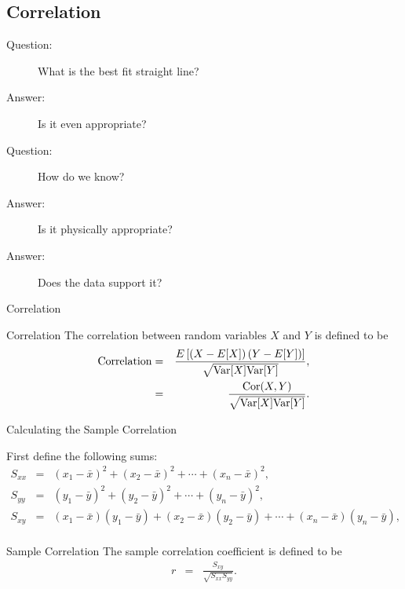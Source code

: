 \subsection{Correlation}

\begin{frame}

  \begin{description}
    \item[Question:] What is the best fit straight line?
    \item[Answer:] Is it even appropriate?
    \item[Question:] How do we know?
    \item[Answer:] Is it physically appropriate?
    \item[Answer:] Does the data support it?
  \end{description}
  
\end{frame}

\begin{frame}{Correlation}

  \begin{definition}{Correlation}
    The correlation between random variables $X$ and $Y$ is defined to
    be 
    \begin{eqnarray*}
      \mathrm{Correlation} & = & \frac{E\left[ \left( X-E[X]\right) \left( Y-E[Y]\right) \right]}{
        \sqrt{\mathrm{Var}[X]\mathrm{Var}[Y]}}, \\
      & = & \frac{\mathrm{Cor}(X,Y)}{\sqrt{\mathrm{Var}[X]\mathrm{Var}[Y]}}.
    \end{eqnarray*}
  \end{definition}
  
\end{frame}

\begin{frame}{Calculating the Sample Correlation}

  First define the following sums:
  \begin{eqnarray*}
    S_{xx} & = & (x_1-\bar{x})^2 + (x_2-\bar{x})^2 + \cdots + (x_n-\bar{x})^2, \\
    S_{yy} & = & (y_1-\bar{y})^2 + (y_2-\bar{y})^2 + \cdots + (y_n-\bar{y})^2, \\
    S_{xy} & = & (x_1-\bar{x})(y_1-\bar{y}) + (x_2-\bar{x})(y_2-\bar{y}) + \cdots + (x_n-\bar{x})(y_n-\bar{y}), \\
  \end{eqnarray*}

  {
    
    \begin{definition}{Sample Correlation}
      The sample correlation coefficient is defined to be
      \begin{eqnarray*}
        r & = & \frac{S_{xy}}{\sqrt{S_{xx} S_{yy}}}.
      \end{eqnarray*}
    \end{definition}

  }
  
\end{frame}


